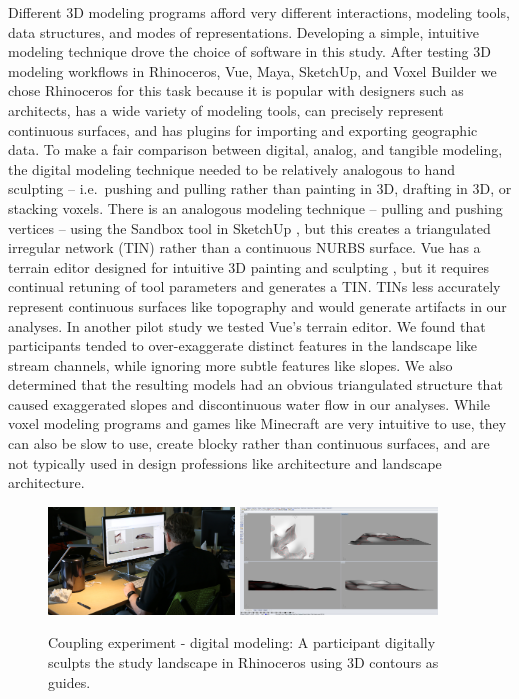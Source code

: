 \documentclass[prodmode,acmtochi]{acmsmall} %
\begin{document}
Different 3D modeling programs afford very different
interactions, modeling tools, data structures, and modes of representations. 
%
Developing a simple, intuitive modeling technique 
drove the choice of software in this study. 
%
After testing 3D modeling workflows in 
Rhinoceros, Vue, Maya, SketchUp, and Voxel Builder
we chose Rhinoceros for this task because it 
is popular with designers such as architects, 
has a wide variety of modeling tools,
can precisely represent continuous surfaces, 
and has plugins for importing and exporting geographic data. 
%
To make a fair comparison between digital, analog, and tangible modeling,
the digital modeling technique needed to be relatively analogous to hand sculpting
-- i.e.~pushing and pulling rather than painting in 3D, drafting in 3D, or stacking voxels.
%
There is an analogous modeling technique -- pulling and pushing vertices -- 
using the Sandbox tool in SketchUp \cite{SketchUp},
but this creates a triangulated irregular network (TIN)
rather than a continuous NURBS surface. 
%
Vue has a terrain editor designed for intuitive 3D painting and sculpting \cite{Vue},
but it requires continual retuning of tool parameters
and generates a TIN. 
%
TINs less accurately represent continuous surfaces like topography
and would generate artifacts in our analyses. 
%
In another pilot study \cite{Harmon2016} we tested Vue's terrain editor. 
We found that participants tended to 
over-exaggerate distinct features in the landscape like stream channels, 
while ignoring more subtle features like slopes.  
We also determined that the resulting models
had an obvious triangulated structure that caused
exaggerated slopes and discontinuous water flow 
in our analyses. 
%
While voxel modeling programs 
and games like Minecraft \cite{Minecraft}
are very intuitive to use,
they can also be slow to use,
create blocky rather than
continuous surfaces, 
and are not typically used in design professions 
like architecture and landscape architecture.

\begin{figure}
\begin{center}
	\includegraphics[height=108px]{images/experiments/art_rhino.jpg}
	\includegraphics[height=108px]{images/experiments/rhino.png}
	\caption{Coupling experiment - digital modeling:
	A participant digitally sculpts the study landscape in Rhinoceros
	using 3D contours as guides.}
	\label{fig:rhino}
\end{center}
\end{figure}
\end{document}
